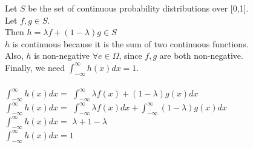 \documentclass[12pt]{article}
\begin{document}
\begin{enumerate}
    Let $S$ be the set of continuous probability distributions over [0,1].\\
    Let $f, g\in S$.\\
    Then $h = \lambda f + (1-\lambda)g \in S$\\
    $h$ is continuous because it is the sum of two continuous functions.\\
    Also, $h$ is non-negative $\forall e\in\Omega$, since $f,g$ are both non-negative.\\
    Finally, we need $\int_{-\infty}^{\infty} h(x) dx = 1$.\\\\

    $\int_{-\infty}^{\infty} h(x) dx =$
      $\int_{-\infty}^{\infty} \lambda f(x) + (1 - \lambda) g(x) dx$\\
    $\int_{-\infty}^{\infty} h(x) dx =$
      $\int_{-\infty}^{\infty} \lambda f(x) dx + \int_{-\infty}^{\infty} (1-\lambda)g(x) dx$\\
    $\int_{-\infty}^{\infty} h(x) dx =$
      $\lambda + 1 - \lambda$\\
    $\int_{-\infty}^{\infty} h(x) dx = 1$\\


\end{enumerate}
\end{document}
